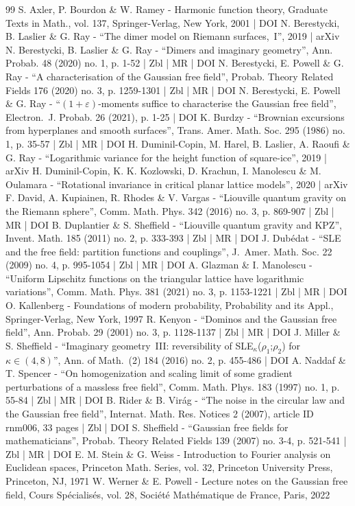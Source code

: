 \begin{thebibliography}{99}
S. Axler, P. Bourdon \& W. Ramey - Harmonic function theory, Graduate Texts in Math., vol. 137, Springer-Verlag, New York, 2001 | DOI
N. Berestycki, B. Laslier \& G. Ray - “The dimer model on Riemann surfaces, I”, 2019 | arXiv
N. Berestycki, B. Laslier \& G. Ray - “Dimers and imaginary geometry”, Ann. Probab. 48 (2020) no. 1, p. 1-52 | Zbl | MR | DOI
N. Berestycki, E. Powell \& G. Ray - “A characterisation of the Gaussian free field”, Probab. Theory Related Fields 176 (2020) no. 3, p. 1259-1301 | Zbl | MR | DOI
N. Berestycki, E. Powell \& G. Ray - “$(1+\varepsilon )$-moments suffice to characterise the Gaussian free field”, Electron. J. Probab. 26 (2021), p. 1-25 | DOI
K. Burdzy - “Brownian excursions from hyperplanes and smooth surfaces”, Trans. Amer. Math. Soc. 295 (1986) no. 1, p. 35-57 | Zbl | MR | DOI
H. Duminil-Copin, M. Harel, B. Laslier, A. Raoufi \& G. Ray - “Logarithmic variance for the height function of square-ice”, 2019 | arXiv
H. Duminil-Copin, K. K. Kozlowski, D. Krachun, I. Manolescu \& M. Oulamara - “Rotational invariance in critical planar lattice models”, 2020 | arXiv
F. David, A. Kupiainen, R. Rhodes \& V. Vargas - “Liouville quantum gravity on the Riemann sphere”, Comm. Math. Phys. 342 (2016) no. 3, p. 869-907 | Zbl | MR | DOI
B. Duplantier \& S. Sheffield - “Liouville quantum gravity and KPZ”, Invent. Math. 185 (2011) no. 2, p. 333-393 | Zbl | MR | DOI
J. Dubédat - “SLE and the free field: partition functions and couplings”, J. Amer. Math. Soc. 22 (2009) no. 4, p. 995-1054 | Zbl | MR | DOI
A. Glazman \& I. Manolescu - “Uniform Lipschitz functions on the triangular lattice have logarithmic variations”, Comm. Math. Phys. 381 (2021) no. 3, p. 1153-1221 | Zbl | MR | DOI
O. Kallenberg - Foundations of modern probability, Probability and its Appl., Springer-Verlag, New York, 1997
R. Kenyon - “Dominos and the Gaussian free field”, Ann. Probab. 29 (2001) no. 3, p. 1128-1137 | Zbl | MR | DOI
J. Miller \& S. Sheffield - “Imaginary geometry III: reversibility of SLE$_\kappa $($\rho _1$;$\rho _2$) for $\kappa \in (4, 8)$”, Ann. of Math. (2) 184 (2016) no. 2, p. 455-486 | DOI
A. Naddaf \& T. Spencer - “On homogenization and scaling limit of some gradient perturbations of a massless free field”, Comm. Math. Phys. 183 (1997) no. 1, p. 55-84 | Zbl | MR | DOI
B. Rider \& B. Virág - “The noise in the circular law and the Gaussian free field”, Internat. Math. Res. Notices 2 (2007), article ID rnm006, 33 pages | Zbl | DOI
S. Sheffield - “Gaussian free fields for mathematicians”, Probab. Theory Related Fields 139 (2007) no. 3-4, p. 521-541 | Zbl | MR | DOI
E. M. Stein \& G. Weiss - Introduction to Fourier analysis on Euclidean spaces, Princeton Math. Series, vol. 32, Princeton University Press, Princeton, NJ, 1971
W. Werner \& E. Powell - Lecture notes on the Gaussian free field, Cours Spécialisés, vol. 28, Société Mathématique de France, Paris, 2022
\end{thebibliography}
